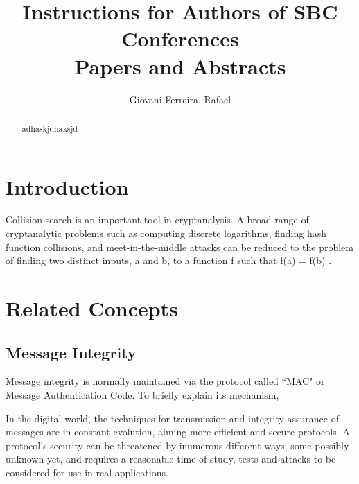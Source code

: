 \documentclass[12pt]{article}
\title{Instructions for Authors of SBC Conferences\\ Papers and Abstracts}
\author{Giovani Ferreira\inst{1}, Rafael\inst{1} }
\begin{document}
\iffalse
\title{Context aware security approach for IoT environments}
\author{\IEEEauthorblockN{Giovani Ferreira and Rafael}
\IEEEauthorblockA{Universal Internet of Things (UIoT)\\ 
Tecnology Faculty (FT)\\
University of Brasília (UFSC)\\
70910-900 – Brasília, DF – Brazil\\
giovani.silva@redes.unb.br, caio.silva@redes.unb.br}
}
\fi

\maketitle

\begin{abstract}
adhaskjdhaksjd \cite{tanenbaum2002distributed}
\end{abstract}

\section{Introduction}

Collision search is an important tool in cryptanalysis. A broad range of cryptanalytic problems
such as computing discrete logarithms, finding hash function collisions, and meet-in-the-middle
attacks can be reduced to the problem of finding two distinct inputs, a and b, to a function f such
that f(a) = f(b) \cite{van1999parallel}.

\section{Related Concepts} 

\subsection{Message Integrity}

Message integrity is normally maintained via the protocol called “MAC" or Message Authentication Code. 
To briefly explain its mechanism,

In the digital world, the techniques for transmission and integrity assurance of messages are in constant
evolution, aiming more efficient and secure protocols. A protocol's security can be threatened by inumerous
different ways, some possibly unknown yet, and requires a reasonable time of study, tests and attacks
to be considered for use in real applications.
\end{document}
